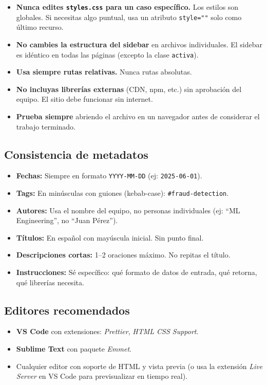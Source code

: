 \documentclass[12pt, a4paper]{article}
\newcommand{\archivo}[1]{\texttt{\textcolor{cpAccent}{#1}}}
\begin{document}
\begin{itemize}[leftmargin=1.5em]
    \item \textbf{Nunca edites \archivo{styles.css} para un caso específico.}
          Los estilos son globales. Si necesitas algo puntual, usa un atributo
          \texttt{style=""} solo como último recurso.
    \item \textbf{No cambies la estructura del sidebar} en archivos individuales.
          El sidebar es idéntico en todas las páginas (excepto la clase \texttt{activa}).
    \item \textbf{Usa siempre rutas relativas.} Nunca rutas absolutas.
    \item \textbf{No incluyas librerías externas} (CDN, npm, etc.) sin aprobación
          del equipo. El sitio debe funcionar sin internet.
    \item \textbf{Prueba siempre} abriendo el archivo en un navegador antes de
          considerar el trabajo terminado.
\end{itemize}

\subsection{Consistencia de metadatos}

\begin{itemize}[leftmargin=1.5em]
    \item \textbf{Fechas:} Siempre en formato \texttt{YYYY-MM-DD} (ej: \texttt{2025-06-01}).
    \item \textbf{Tags:} En minúsculas con guiones (kebab-case): \texttt{\#fraud-detection}.
    \item \textbf{Autores:} Usa el nombre del equipo, no personas individuales
          (ej: ``ML Engineering'', no ``Juan Pérez'').
    \item \textbf{Títulos:} En español con mayúscula inicial. Sin punto final.
    \item \textbf{Descripciones cortas:} 1--2 oraciones máximo. No repitas el título.
    \item \textbf{Instrucciones:} Sé específico: qué formato de datos de entrada,
          qué retorna, qué librerías necesita.
\end{itemize}

\subsection{Editores recomendados}

\begin{itemize}[leftmargin=1.5em]
    \item \textbf{VS Code} con extensiones: \textit{Prettier}, \textit{HTML CSS Support}.
    \item \textbf{Sublime Text} con paquete \textit{Emmet}.
    \item Cualquier editor con soporte de HTML y vista previa (o usa la extensión
          \textit{Live Server} en VS Code para previsualizar en tiempo real).
\end{itemize}
\end{document}
